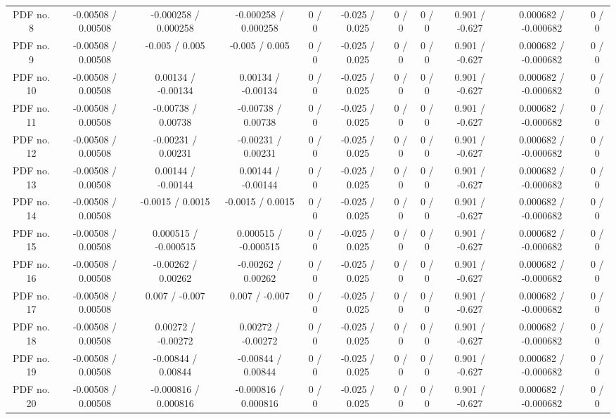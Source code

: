 \begin{table}[htbp]
\begin{center}
\begin{tabular}{|c|c|c|c|c|c|c|c|c|c|c|}
  PDF no. 8 & -0.00508 / 0.00508 & -0.000258 / 0.000258 & -0.000258 / 0.000258 & 0 / 0 & -0.025 / 0.025 & 0 / 0 & 0 / 0 & 0.901 / -0.627 & 0.000682 / -0.000682 & 0 / 0 \\ 
  PDF no. 9 & -0.00508 / 0.00508 & -0.005 / 0.005 & -0.005 / 0.005 & 0 / 0 & -0.025 / 0.025 & 0 / 0 & 0 / 0 & 0.901 / -0.627 & 0.000682 / -0.000682 & 0 / 0 \\ 
  PDF no. 10 & -0.00508 / 0.00508 & 0.00134 / -0.00134 & 0.00134 / -0.00134 & 0 / 0 & -0.025 / 0.025 & 0 / 0 & 0 / 0 & 0.901 / -0.627 & 0.000682 / -0.000682 & 0 / 0 \\ 
  PDF no. 11 & -0.00508 / 0.00508 & -0.00738 / 0.00738 & -0.00738 / 0.00738 & 0 / 0 & -0.025 / 0.025 & 0 / 0 & 0 / 0 & 0.901 / -0.627 & 0.000682 / -0.000682 & 0 / 0 \\ 
  PDF no. 12 & -0.00508 / 0.00508 & -0.00231 / 0.00231 & -0.00231 / 0.00231 & 0 / 0 & -0.025 / 0.025 & 0 / 0 & 0 / 0 & 0.901 / -0.627 & 0.000682 / -0.000682 & 0 / 0 \\ 
  PDF no. 13 & -0.00508 / 0.00508 & 0.00144 / -0.00144 & 0.00144 / -0.00144 & 0 / 0 & -0.025 / 0.025 & 0 / 0 & 0 / 0 & 0.901 / -0.627 & 0.000682 / -0.000682 & 0 / 0 \\ 
  PDF no. 14 & -0.00508 / 0.00508 & -0.0015 / 0.0015 & -0.0015 / 0.0015 & 0 / 0 & -0.025 / 0.025 & 0 / 0 & 0 / 0 & 0.901 / -0.627 & 0.000682 / -0.000682 & 0 / 0 \\ 
  PDF no. 15 & -0.00508 / 0.00508 & 0.000515 / -0.000515 & 0.000515 / -0.000515 & 0 / 0 & -0.025 / 0.025 & 0 / 0 & 0 / 0 & 0.901 / -0.627 & 0.000682 / -0.000682 & 0 / 0 \\ 
  PDF no. 16 & -0.00508 / 0.00508 & -0.00262 / 0.00262 & -0.00262 / 0.00262 & 0 / 0 & -0.025 / 0.025 & 0 / 0 & 0 / 0 & 0.901 / -0.627 & 0.000682 / -0.000682 & 0 / 0 \\ 
  PDF no. 17 & -0.00508 / 0.00508 & 0.007 / -0.007 & 0.007 / -0.007 & 0 / 0 & -0.025 / 0.025 & 0 / 0 & 0 / 0 & 0.901 / -0.627 & 0.000682 / -0.000682 & 0 / 0 \\ 
  PDF no. 18 & -0.00508 / 0.00508 & 0.00272 / -0.00272 & 0.00272 / -0.00272 & 0 / 0 & -0.025 / 0.025 & 0 / 0 & 0 / 0 & 0.901 / -0.627 & 0.000682 / -0.000682 & 0 / 0 \\ 
  PDF no. 19 & -0.00508 / 0.00508 & -0.00844 / 0.00844 & -0.00844 / 0.00844 & 0 / 0 & -0.025 / 0.025 & 0 / 0 & 0 / 0 & 0.901 / -0.627 & 0.000682 / -0.000682 & 0 / 0 \\ 
  PDF no. 20 & -0.00508 / 0.00508 & -0.000816 / 0.000816 & -0.000816 / 0.000816 & 0 / 0 & -0.025 / 0.025 & 0 / 0 & 0 / 0 & 0.901 / -0.627 & 0.000682 / -0.000682 & 0 / 0 \\ 

\end{tabular}
\end{center}
\end{table}
